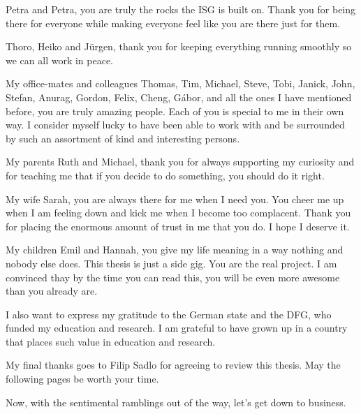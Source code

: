 %
Petra and Petra, you are truly the rocks the ISG is built on.
%
Thank you for being there for everyone while making everyone feel like you are
there just for them.
%


%
Thoro, Heiko and Jürgen, thank you for keeping everything running smoothly so we
can all work in peace.
%


%
My office-mates and colleagues Thomas, Tim, Michael, Steve, Tobi, Janick, John,
Stefan, Anurag, Gordon, Felix, Cheng, G\'abor, and all the ones I have mentioned
before, you are truly amazing people.
%
Each of you is special to me in their own way.
%
I consider myself lucky to have been able to work with and be surrounded by such
an assortment of kind and interesting persons.
%

%
My parents Ruth and Michael, thank you for always supporting my curiosity and
for teaching me that if you decide to do something, you should do it right.
%

%
My wife Sarah, you are always there for me when I need you.
%
You cheer me up when I am feeling down and kick me when I become too complacent.
%
Thank you for placing the enormous amount of trust in me that you do.
%
I hope I deserve it.
%

%
My children Emil and Hannah, you give my life meaning in a way nothing and
nobody else does.
%
This thesis is just a side gig.
%
You are the real project.
%
I am convinced thay by the time you can read this, you will be even more awesome
than you already are.
%

%
I also want to express my gratitude to the German state and the DFG, who funded
my education and research.
%
I am grateful to have grown up in a country that places such value in education
and research.
%

%
My final thanks goes to Filip Sadlo for agreeing to review this thesis.
%
May the following pages be worth your time.
%

%
Now, with the sentimental ramblings out of the way, let's get down to business.
%
%
%
%
%
%
%
%
%
%
%